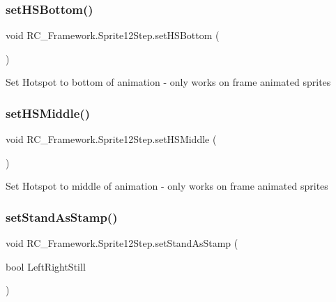 \subsubsection{\texorpdfstring{set\+H\+S\+Bottom()}{setHSBottom()}}
{\footnotesize\ttfamily void R\+C\+\_\+\+Framework.\+Sprite12\+Step.\+set\+H\+S\+Bottom (\begin{DoxyParamCaption}{ }\end{DoxyParamCaption})}



Set Hotspot to bottom of animation -\/ only works on frame animated sprites 

\mbox{\label{class_r_c___framework_1_1_sprite12_step_a1733812fda63f099381f34d7d9c704fb}} 
\subsubsection{\texorpdfstring{set\+H\+S\+Middle()}{setHSMiddle()}}
{\footnotesize\ttfamily void R\+C\+\_\+\+Framework.\+Sprite12\+Step.\+set\+H\+S\+Middle (\begin{DoxyParamCaption}{ }\end{DoxyParamCaption})}



Set Hotspot to middle of animation -\/ only works on frame animated sprites 

\mbox{\label{class_r_c___framework_1_1_sprite12_step_afe64cd923b9e6dfdd5827321c0b2d134}} 
\subsubsection{\texorpdfstring{set\+Stand\+As\+Stamp()}{setStandAsStamp()}}
{\footnotesize\ttfamily void R\+C\+\_\+\+Framework.\+Sprite12\+Step.\+set\+Stand\+As\+Stamp (\begin{DoxyParamCaption}\item[{bool}]{Left\+Right\+Still }\end{DoxyParamCaption})}

